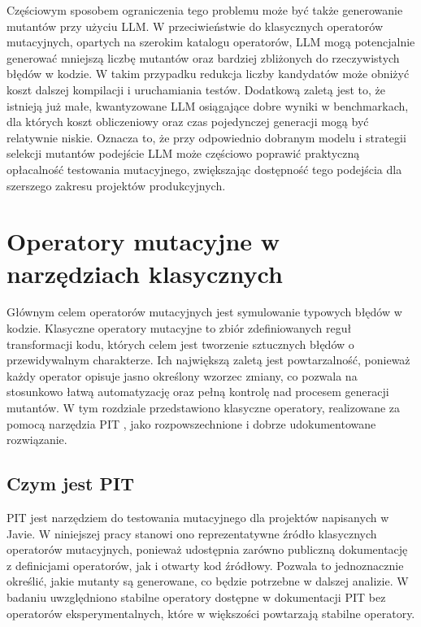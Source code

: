 \documentclass[12pt,a4paper,oldfontcommands]{memoir}
\theoremstyle{plain}
\theoremstyle{definition}
\theoremstyle{remark}
\begin{document}
    Częściowym sposobem ograniczenia tego problemu może być także generowanie mutantów przy użyciu LLM.
    W przeciwieństwie do klasycznych operatorów mutacyjnych, opartych na szerokim katalogu operatorów, LLM mogą potencjalnie generować mniejszą liczbę mutantów oraz bardziej zbliżonych do rzeczywistych błędów w kodzie.
    W takim przypadku redukcja liczby kandydatów może obniżyć koszt dalszej kompilacji i uruchamiania testów.
    Dodatkową zaletą jest to, że istnieją już małe, kwantyzowane LLM osiągające dobre wyniki w benchmarkach, dla których koszt obliczeniowy oraz czas pojedynczej generacji mogą być relatywnie niskie.
    Oznacza to, że przy odpowiednio dobranym modelu i strategii selekcji mutantów podejście LLM może częściowo poprawić praktyczną opłacalność testowania mutacyjnego, zwiększając dostępność tego podejścia dla szerszego zakresu projektów produkcyjnych.

    \clearpage
    \openany
    \chapter{Operatory mutacyjne w narzędziach klasycznych}
    \openright

    Głównym celem operatorów mutacyjnych jest symulowanie typowych błędów w kodzie.
    Klasyczne operatory mutacyjne to zbiór zdefiniowanych reguł transformacji kodu, których celem jest tworzenie sztucznych błędów o przewidywalnym charakterze.
    Ich największą zaletą jest powtarzalność, ponieważ każdy operator opisuje jasno określony wzorzec zmiany, co pozwala na stosunkowo łatwą automatyzację oraz pełną kontrolę nad procesem generacji mutantów.
    W tym rozdziale przedstawiono klasyczne operatory, realizowane za pomocą narzędzia PIT \cite{ref1}, jako rozpowszechnione i dobrze udokumentowane rozwiązanie.

    \section{Czym jest PIT}

    PIT jest narzędziem do testowania mutacyjnego dla projektów napisanych w Javie.
    W niniejszej pracy stanowi ono reprezentatywne źródło klasycznych operatorów mutacyjnych, ponieważ udostępnia zarówno publiczną dokumentację z definicjami operatorów, jak i otwarty kod źródłowy.
    Pozwala to jednoznacznie określić, jakie mutanty są generowane, co będzie potrzebne w dalszej analizie.
    W badaniu uwzględniono stabilne operatory dostępne w dokumentacji PIT bez operatorów eksperymentalnych, które w większości powtarzają stabilne operatory.
\end{document}
